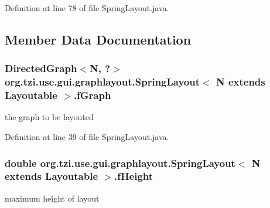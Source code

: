 Definition at line 78 of file Spring\-Layout.\-java.



\subsection{Member Data Documentation}
\hypertarget{classorg_1_1tzi_1_1use_1_1gui_1_1graphlayout_1_1_spring_layout_3_01_n_01extends_01_layoutable_01_4_af96110b36aa996c03972d378ac1a3607}{
\subsubsection[{f\-Graph}]{\setlength{\rightskip}{0pt plus 5cm}Directed\-Graph$<$N, ?$>$ org.\-tzi.\-use.\-gui.\-graphlayout.\-Spring\-Layout$<$ N extends {\bf Layoutable} $>$.f\-Graph\hspace{0.3cm}{\ttfamily [protected]}}}\label{classorg_1_1tzi_1_1use_1_1gui_1_1graphlayout_1_1_spring_layout_3_01_n_01extends_01_layoutable_01_4_af96110b36aa996c03972d378ac1a3607}
the graph to be layouted 

Definition at line 39 of file Spring\-Layout.\-java.

\hypertarget{classorg_1_1tzi_1_1use_1_1gui_1_1graphlayout_1_1_spring_layout_3_01_n_01extends_01_layoutable_01_4_a9008e461e113a5b2b4f883483af729a4}{
\subsubsection[{f\-Height}]{\setlength{\rightskip}{0pt plus 5cm}double org.\-tzi.\-use.\-gui.\-graphlayout.\-Spring\-Layout$<$ N extends {\bf Layoutable} $>$.f\-Height\hspace{0.3cm}{\ttfamily [protected]}}}\label{classorg_1_1tzi_1_1use_1_1gui_1_1graphlayout_1_1_spring_layout_3_01_n_01extends_01_layoutable_01_4_a9008e461e113a5b2b4f883483af729a4}
maximum height of layout 

